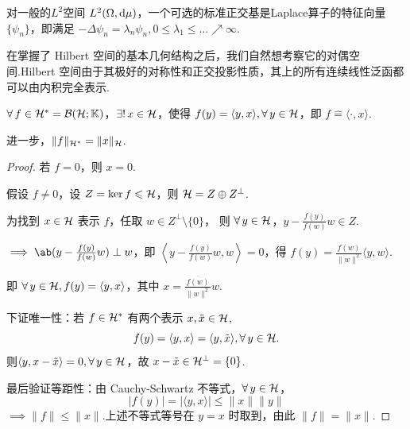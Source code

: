 对一般的$L^2$空间 $L^2(\Omega, \mathop{}\!\mathrm{d}\mu)$，一个可选的标准正交基是Laplace算子的特征向量$\{\psi_n\}$，即满足 $-\Delta \psi_n = \lambda_n \psi_n, 0 \leq \lambda_1 \leq \dots \nearrow \infty$.

在掌握了 Hilbert 空间的基本几何结构之后，我们自然想考察它的对偶空间.Hilbert 空间由于其极好的对称性和正交投影性质，其上的所有连续线性泛函都可以由内积完全表示.

\begin{theorem}
    $\forall\, f \in \mathcal{H}^* = \mathcal{B}(\mathcal{H}; \mathbb{K})$，$\exists !\, x \in \mathcal{H}$，使得 $f(y) = \langle y, x \rangle, \forall\, y \in \mathcal{H}$，即 $f \hat{=} \langle \cdot, x \rangle$.\par
    进一步，$\|f\|_{\mathcal{H}^*} = \|x\|_{\mathcal{H}}$.\par
\end{theorem}

\begin{proof}
    若 $f = 0$，则 $x = 0$.\par
    假设 $f \neq 0$，设 $Z = \ker f \leqslant \mathcal{H}$，则 $\mathcal{H} = Z \oplus Z^\perp$.\par
    为找到 $x \in \mathcal{H}$ 表示 $f$，任取 $w \in Z^\perp \setminus \{0\}$，
    则 $\forall\, y \in \mathcal{H}$，$y - \frac{f(y)}{f(w)} w \in Z$.\par
    $\implies \ab(y - \frac{f(y)}{f(w)} w) \perp w$，即 $\left\langle y - \frac{f(y)}{f(w)} w, w \right\rangle = 0$，得 $f(y) = \frac{f(w)}{\|w\|^2} \langle y, w \rangle$.\par
    即 $\forall\, y \in \mathcal{H}, f(y) = \langle y, x \rangle$，其中 $x = \frac{\overline{f(w)}}{\|w\|^2} w$.\par
    下证唯一性：若 $f \in \mathcal{H}^*$ 有两个表示 $x, \tilde{x} \in \mathcal{H}$,
    \begin{equation*}
    f(y) = \langle y, x \rangle = \langle y, \tilde{x} \rangle, \forall\, y \in \mathcal{H}.
    \end{equation*}
    则$\langle y, x - \tilde{x} \rangle = 0, \forall\, y \in \mathcal{H}$，故 $x - \tilde{x} \in \mathcal{H}^\perp = \{0\}$.\par
    最后验证等距性：由 Cauchy-Schwartz 不等式，$\forall\, y \in \mathcal{H}$，
    \begin{equation*}
        |f(y)| = |\langle y, x \rangle| \leq \|x\| \|y\|
    \end{equation*}
    $\implies \|f\| \leq \|x\|$.上述不等式等号在 $y = x$ 时取到，由此 $\|f\| = \|x\|$.
\end{proof}

